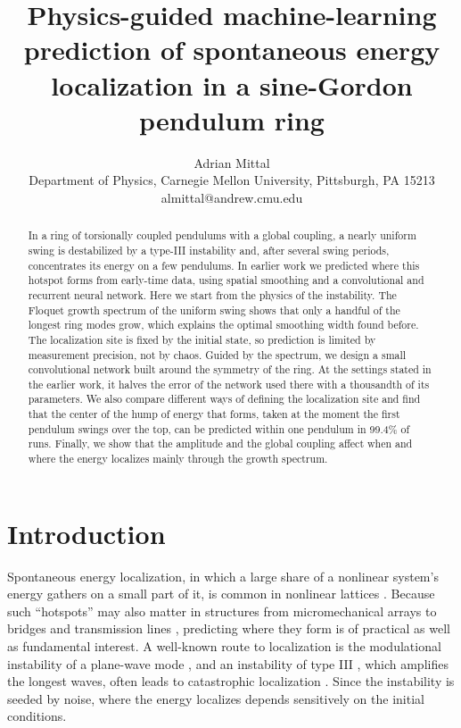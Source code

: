 \documentclass[11pt]{article}
\title{Physics-guided machine-learning prediction of spontaneous energy localization in a sine-Gordon pendulum ring}
\author{Adrian Mittal\\[6pt]
{\small Department of Physics, Carnegie Mellon University, Pittsburgh, PA 15213}\\[6pt]
{\small almittal@andrew.cmu.edu}}
\date{}
\begin{document}
\maketitle

\begin{abstract}
In a ring of torsionally coupled pendulums with a global coupling, a nearly uniform swing is destabilized by a type-III instability and, after several swing periods, concentrates its energy on a few pendulums. In earlier work we predicted where this hotspot forms from early-time data, using spatial smoothing and a convolutional and recurrent neural network. Here we start from the physics of the instability. The Floquet growth spectrum of the uniform swing shows that only a handful of the longest ring modes grow, which explains the optimal smoothing width found before. The localization site is fixed by the initial state, so prediction is limited by measurement precision, not by chaos. Guided by the spectrum, we design a small convolutional network built around the symmetry of the ring. At the settings stated in the earlier work, it halves the error of the network used there with a thousandth of its parameters. We also compare different ways of defining the localization site and find that the center of the hump of energy that forms, taken at the moment the first pendulum swings over the top, can be predicted within one pendulum in 99.4\% of runs. Finally, we show that the amplitude and the global coupling affect when and where the energy localizes mainly through the growth spectrum.
\end{abstract}

\section{Introduction}
\label{sec:intro}

Spontaneous energy localization, in which a large share of a nonlinear system's energy gathers on a small part of it, is common in nonlinear lattices \cite{sievers1988intrinsic,campbell2004localizing,flach2008discrete}. Because such ``hotspots'' may also matter in structures from micromechanical arrays to bridges and transmission lines \cite{sato2006colloquium,green2006failure,ARIOLI2015901,zhang2017wind}, predicting where they form is of practical as well as fundamental interest. A well-known route to localization is the modulational instability of a plane-wave mode \cite{kivshar1993creation,dauxois1993energy,extreme}, and an instability of type III \cite{cross1993pattern}, which amplifies the longest waves, often leads to catastrophic localization \cite{english2003modulational,thakur2007driven,cuevas2009discrete}. Since the instability is seeded by noise, where the energy localizes depends sensitively on the initial conditions.
\end{document}
